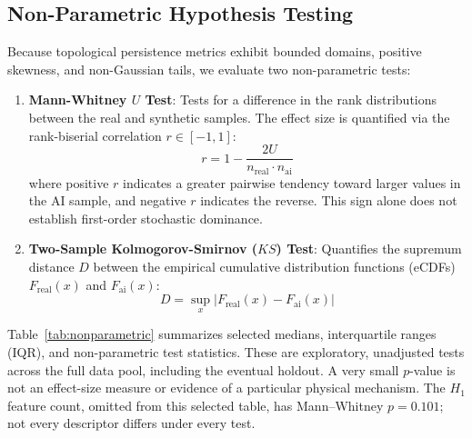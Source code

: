 \documentclass[11pt,a4paper]{article}
\begin{document}
\subsection{Non-Parametric Hypothesis Testing}
Because topological persistence metrics exhibit bounded domains, positive skewness, and non-Gaussian tails, we evaluate two non-parametric tests:
\begin{enumerate}
    \item \textbf{Mann-Whitney $U$ Test}: Tests for a difference in the rank distributions between the real and synthetic samples. The effect size is quantified via the rank-biserial correlation $r \in [-1, 1]$:
    \begin{equation}
        r = 1 - \frac{2U}{n_{\text{real}} \cdot n_{\text{ai}}}
    \end{equation}
    where positive $r$ indicates a greater pairwise tendency toward larger values in the AI sample, and negative $r$ indicates the reverse. This sign alone does not establish first-order stochastic dominance.
    \item \textbf{Two-Sample Kolmogorov-Smirnov ($KS$) Test}: Quantifies the supremum distance $D$ between the empirical cumulative distribution functions (eCDFs) $F_{\text{real}}(x)$ and $F_{\text{ai}}(x)$:
    \begin{equation}
        D = \sup_x |F_{\text{real}}(x) - F_{\text{ai}}(x)|
    \end{equation}
\end{enumerate}

Table~\ref{tab:nonparametric} summarizes selected medians, interquartile ranges (IQR), and non-parametric test statistics. These are exploratory, unadjusted tests across the full data pool, including the eventual holdout. A very small $p$-value is not an effect-size measure or evidence of a particular physical mechanism. The $H_1$ feature count, omitted from this selected table, has Mann--Whitney $p=0.101$; not every descriptor differs under every test.
\end{document}
